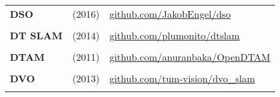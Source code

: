 \documentclass[a4paper,12pt]{scrartcl}
\begin{document}
{\begin{longtable}{l|l|l}
    \textbf{DSO}                                                                                                                  & \cite{Engel2016} (2016)
                                                                                                                                  & {\href{https://github.com/JakobEngel/dso}{github.com/JakobEngel/dso}}                     \\
                                                                                                                                  &                                                                                            &   \\ [-3mm]
    \textbf{DT SLAM}                                                                                                              & \cite{Daniel2014} (2014)
                                                                                                                                  & {\href{https://github.com/plumonito/dtslam}{github.com/plumonito/dtslam}}                 \\
                                                                                                                                  &                                                                                            &   \\ [-3mm]
    \textbf{DTAM}                                                                                                                 & \cite{Newcombe2011} (2011)
                                                                                                                                  & {\href{https://github.com/anuranbaka/OpenDTAM}{github.com/anuranbaka/OpenDTAM}}           \\
                                                                                                                                  &                                                                                            &   \\ [-3mm]
    \textbf{DVO}                                                                                                                  & \cite{Kerl2013} (2013)
                                                                                                                                  & {\href{https://github.com/tum-vision/dvo_slam}{github.com/tum-vision/dvo\_slam}}          \\
                                                                                                                                  &                                                                                            &   \\ [-3mm]

\end{longtable}}
\end{document}
